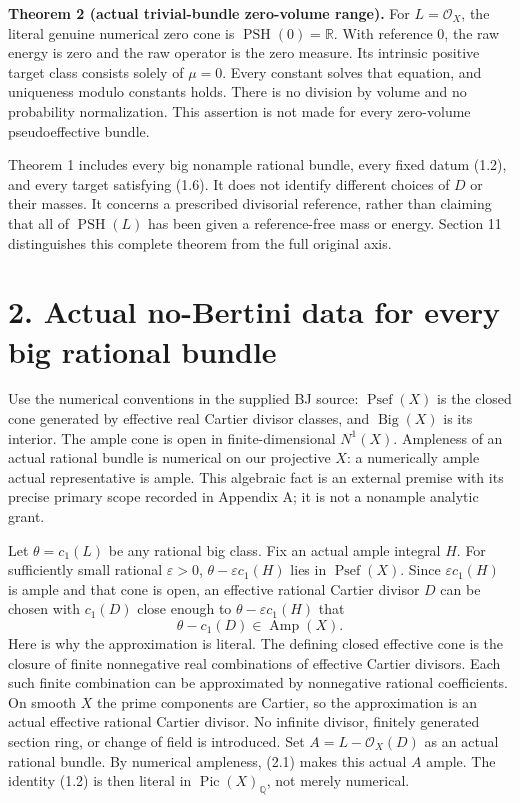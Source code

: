 \documentclass[
  10pt,
]{article}
\begin{document}
\textbf{Theorem 2 (actual trivial-bundle zero-volume range).} For
\(L=\mathcal O_X\), the literal genuine numerical zero cone is
\(\operatorname{PSH}(0)=\mathbb R\). With reference \(0\), the raw
energy is zero and the raw operator is the zero measure. Its intrinsic
positive target class consists solely of \(\mu=0\). Every constant
solves that equation, and uniqueness modulo constants holds. There is no
division by volume and no probability normalization. This assertion is
not made for every zero-volume pseudoeffective bundle.

Theorem 1 includes every big nonample rational bundle, every fixed datum
(1.2), and every target satisfying (1.6). It does not identify different
choices of \(D\) or their masses. It concerns a prescribed divisorial
reference, rather than claiming that all of \(\operatorname{PSH}(L)\)
has been given a reference-free mass or energy. Section 11 distinguishes
this complete theorem from the full original axis.

\section{2. Actual no-Bertini data for every big rational
bundle}\label{actual-no-bertini-data-for-every-big-rational-bundle}

Use the numerical conventions in the supplied BJ source:
\(\operatorname{Psef}(X)\) is the closed cone generated by effective
real Cartier divisor classes, and \(\operatorname{Big}(X)\) is its
interior. The ample cone is open in finite-dimensional \(N^1(X)\).
Ampleness of an actual rational bundle is numerical on our projective
\(X\): a numerically ample actual representative is ample. This
algebraic fact is an external premise with its precise primary scope
recorded in Appendix A; it is not a nonample analytic grant.

Let \(\theta=c_1(L)\) be any rational big class. Fix an actual ample
integral \(H\). For sufficiently small rational \(\varepsilon>0\),
\(\theta-\varepsilon c_1(H)\) lies in \(\operatorname{Psef}(X)\). Since
\(\varepsilon c_1(H)\) is ample and that cone is open, an effective
rational Cartier divisor \(D\) can be chosen with \(c_1(D)\) close
enough to \(\theta-\varepsilon c_1(H)\) that
\[\theta-c_1(D)\in\operatorname{Amp}(X).\tag{2.1}\] Here is why the
approximation is literal. The defining closed effective cone is the
closure of finite nonnegative real combinations of effective Cartier
divisors. Each such finite combination can be approximated by
nonnegative rational coefficients. On smooth \(X\) the prime components
are Cartier, so the approximation is an actual effective rational
Cartier divisor. No infinite divisor, finitely generated section ring,
or change of field is introduced. Set \(A=L-\mathcal O_X(D)\) as an
actual rational bundle. By numerical ampleness, (2.1) makes this actual
\(A\) ample. The identity (1.2) is then literal in
\(\operatorname{Pic}(X)_{\mathbb Q}\), not merely numerical.
\end{document}
